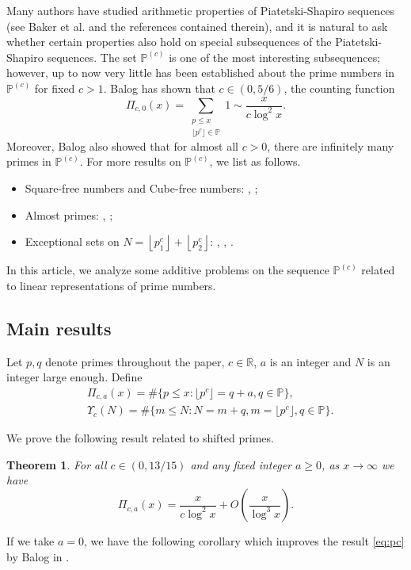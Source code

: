 \documentclass[12pt, reqno, twoside, letterpaper]{amsart}
\numberwithin{equation}{section}
\def\fl#1{\left\lfloor#1\right\rfloor}
\newcommand{\PP}{\ensuremath{\mathbb{P}}}
\newcommand{\RR}{\ensuremath{\mathbb{R}}}
\theoremstyle{customthm}
\newtheorem{theorem}[Y]{Theorem}
\theoremstyle{customrem}
\begin{document}
Many authors have studied arithmetic properties of Piatetski-Shapiro sequences (see Baker et al.\cite{Baker} and the references contained therein), and it is natural to ask whether certain properties also hold on special subsequences of the Piatetski-Shapiro sequences. The set $\mathbb{P}^{(c)}$ is one of the most interesting subsequences; however, up to now very little has been established about the prime numbers in $\PP^{(c)}$ for fixed $c > 1$. Balog \cite{Balog} has shown that $c\in (0, 5/6)$, the counting function
\begin{equation}
\label{eq:pc}
\Pi_{c, 0}(x) =\sum_{\substack{p\leqslant x \\ \lfloor p^c \rfloor \in \PP}}1\sim \frac{x}{c\log ^2 x}.
\end{equation}
Moreover, Balog also showed that for almost all $c > 0$, there are infinitely many primes in $\PP^{(c)}$. For more results on $\mathbb{P}^{(c)}$, we list as follows.

\begin{itemize}
	\item Square-free numbers and Cube-free numbers: \cite{CZ2008}, \cite{ZL2017};
	\item Almost primes: \cite{BGS}, \cite{XLZ2024};
	\item Exceptional sets on $N = \fl{p_1^c} + \fl{p_2^c}$: \cite{Baker2024}, \cite{Lap1999}, \cite{Zhu2017}. 
\end{itemize}

In this article, we analyze some additive problems on the sequence $\PP^{(c)}$ related to linear representations of prime numbers. 

\subsection{Main results}
Let $p,q$ denote primes throughout the paper, $c\in \RR$, $a$ is an integer and $N$ is an integer large enough. Define
\begin{align*}
&\Pi_{c,a}(x)=\#\{p\leqslant x: \lfloor p^c\rfloor = q+a, q\in \PP\},\\
&\Upsilon_c(N)=\#\{m \leqslant N: N = m + q, m = \lfloor p^c\rfloor, q\in \PP\}.
\end{align*}

We prove the following result related to shifted primes.  

\begin{theorem} For all $c \in (0, 13/15)$ and any fixed integer $a\geqslant 0$, as $x\rightarrow \infty$ we have
	\label{thm:main_1}
	$$
	\Pi_{c,a}(x)=\frac{x}{c\log ^2 x}+ O(\frac{x}{\log ^3x}).
	$$
\end{theorem}
If we take $a=0$, we have the following corollary which improves the result \eqref{eq:pc} by Balog in \cite{Balog}.
\end{document}

